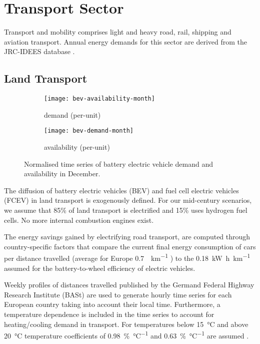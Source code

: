 \section{Transport Sector}
\label{sec:si:transport}

Transport and mobility comprises light and heavy road, rail, shipping and
aviation transport. Annual energy demands for this sector are derived from the
JRC-IDEES database .

\subsection{Land Transport}
\label{sec:si:transport:land}

\begin{figure}
    \centering
    \begin{subfigure}[t]{\textwidth}
        \centering
        \caption{demand (per-unit)}
        \texttt{[image: bev-availability-month]}
    \end{subfigure}
    \vspace{-0.5cm}
    \begin{subfigure}[t]{\textwidth}
        \centering
        \caption{availability (per-unit)}
        \texttt{[image: bev-demand-month]}
    \end{subfigure}
    \caption{Normalised time series of battery electric vehicle demand and availability in December.}
    \label{fig:bev-demand-availability}
\end{figure}

The diffusion of battery electric vehicles (BEV) and fuel cell electric vehicles
(FCEV) in land transport is exogenously defined. For our mid-century scenarios,
we assume that 85\% of land transport is electrified and 15\% uses hydrogen fuel
cells. No more internal combustion engines exist.

The energy savings gained by electrifying road transport, are computed through
country-specific factors that compare the current final energy consumption of
cars per distance travelled (average for Europe
\SI{0.7}{\kwh\per\kilo\metre} ) to the
\SI{0.18}{\kilo\watt\hour\per\kilo\metre} assumed for the battery-to-wheel
efficiency of electric vehicles.

Weekly profiles of distances travelled published by the Germand Federal Highway
Research Institute (BASt)  are used to generate hourly time series for
each European country taking into account their local time. Furthermore, a
temperature dependence is included in the time series to account for
heating/cooling demand in transport. For temperatures below \SI{15}{\celsius}
and above \SI{20}{\celsius} temperature coefficients of
\SI{0.98}{\percent\per\celsius} and \SI{0.63}{\percent\per\celsius} are assumed
.

